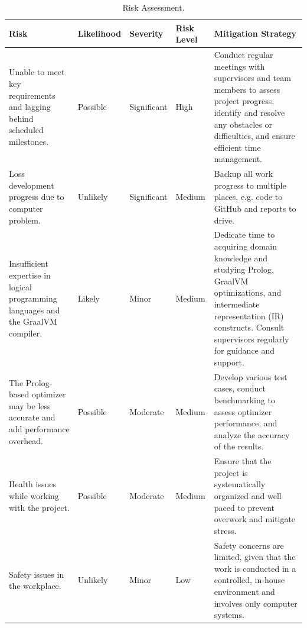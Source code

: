 \begin{table}[h]
    \begin{tabularx}{1\textwidth} { 
        | >{\raggedright\arraybackslash}p{8em}
        | >{\raggedright\arraybackslash}p{4.5em} 
        | >{\raggedright\arraybackslash}p{4.5em} 
        | >{\raggedright\arraybackslash}p{3.5em} 
        | >{\raggedright\arraybackslash}X 
        | 
        }   
        \hline
        \textbf{Risk} & 
        \textbf{Likelihood} & 
        \textbf{Severity} & 
        \textbf{Risk Level} &
        \textbf{Mitigation Strategy}
        \\ 
        \hline
        Unable to meet key requirements and lagging behind scheduled milestones.
        & Possible & Significant & High & 
        Conduct regular meetings with supervisors and team members to assess project progress, identify and resolve any obstacles or difficulties, and ensure efficient time management.
        \\ 
        \hline
        Loss development progress due to computer problem.
        & Unlikely & Significant & Medium & 
        Backup all work progress to multiple places, e.g. code to GitHub and reports to drive.
        \\ 
        \hline
        Insufficient expertise in logical programming languages and the GraalVM compiler.
        & Likely & Minor & Medium &
        Dedicate time to acquiring domain knowledge and studying Prolog, GraalVM optimizations, and intermediate representation (IR) constructs. Consult supervisors regularly for guidance and support.
        \\ 
        \hline
        The Prolog-based optimizer may be less accurate and add performance overhead.
        & Possible & Moderate & Medium &
        Develop various test cases, conduct benchmarking to assess optimizer performance, and analyze the accuracy of the results.
        \\ 
        \hline
        Health issues while working with the project.
        & Possible & Moderate & Medium &
        Ensure that the project is systematically organized and well paced to prevent overwork and mitigate stress.
        \\ 
        \hline
        Safety issues in the workplace.
        & Unlikely & Minor & Low &
        Safety concerns are limited, given that the work is conducted in a controlled, in-house environment and involves only computer systems.
        \\ 
        \hline
    \end{tabularx}
\caption{Risk Assessment.}
\end{table}

